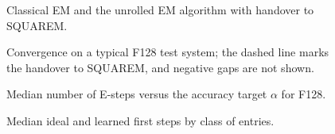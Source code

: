 \documentclass[10pt]{article}
\newcommand{\column}[1]{\begin{minipage}{88.9mm}\centering #1\end{minipage}}
\begin{document}
\begin{figure}[h]
\centering
\column{}
\caption{Classical EM and the unrolled EM algorithm with handover to SQUAREM.}
\end{figure}

\begin{figure}[h]
\centering

\caption{Convergence on a typical F128 test system; the dashed line marks the handover to SQUAREM, and negative gaps are not shown.}
\end{figure}

\begin{figure}[h]
\centering
\column{}
\caption{Median number of E-steps versus the accuracy target $\alpha$ for F128.}
\end{figure}

\begin{figure}[h]
\centering
\column{}
\caption{Median ideal and learned first steps by class of entries.}
\end{figure}
\end{document}
